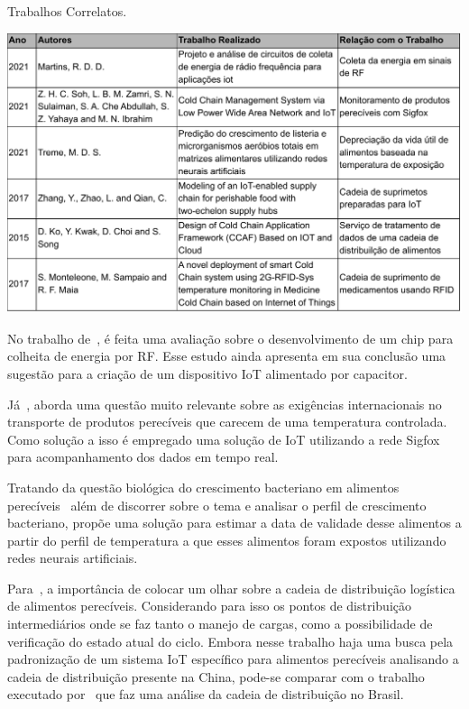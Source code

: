 \begin{quadro}
  \caption{Trabalhos Correlatos.}
  \begin{center}
      \includegraphics[scale=0.64]{img/correlatos.pdf}
  \end{center}
  \label{qd:correlatos}
\end{quadro}

No trabalho de~, é feita uma avaliação sobre o desenvolvimento de um chip para colheita de energia por RF. Esse estudo ainda apresenta em sua conclusão uma sugestão para a criação de um dispositivo IoT alimentado por capacitor.

Já~, aborda uma questão muito relevante sobre as exigências internacionais no transporte de produtos perecíveis que carecem de uma temperatura controlada. Como solução a isso é empregado uma solução de IoT utilizando a rede Sigfox para acompanhamento dos dados em tempo real.

Tratando da questão biológica do crescimento bacteriano em alimentos perecíveis~ além de discorrer sobre o tema e analisar o perfil de crescimento bacteriano, propõe uma solução para estimar a data de validade desse alimentos a partir do perfil de temperatura a que esses alimentos foram expostos utilizando redes neurais artificiais.

Para~, a importância de colocar um olhar sobre a cadeia de distribuição logística de alimentos perecíveis. Considerando para isso os pontos de distribuição intermediários onde se faz tanto o manejo de cargas, como a possibilidade de verificação do estado atual do ciclo. Embora nesse trabalho haja uma busca pela padronização de um sistema IoT específico para alimentos perecíveis analisando a cadeia de distribuição presente na China, pode-se comparar com o trabalho executado por~ que faz uma análise da cadeia de distribuição no Brasil.

